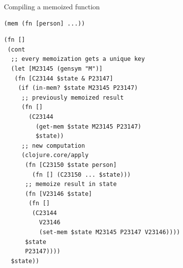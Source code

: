 \documentclass{beamer}
\begin{document}
\begin{frame}[fragile]{Compiling a memoized function}
    \vspace{-2em}
    \begin{minipage}{0.38\textwidth}
\begin{verbatim}
(mem (fn [person] ...))
\end{verbatim}
    \end{minipage}
    \begin{minipage}{0.52\textwidth}
    \vspace{2em}
\begin{verbatim}
(fn []
 (cont
  ;; every memoization gets a unique key  
  (let [M23145 (gensym "M")]
   (fn [C23144 $state & P23147]
    (if (in-mem? $state M23145 P23147)
     ;; previously memoized result
     (fn []
       (C23144
         (get-mem $state M23145 P23147)
         $state))
     ;; new computation
     (clojure.core/apply
      (fn [C23150 $state person]
        (fn [] (C23150 ... $state)))
      ;; memoize result in state
      (fn [V23146 $state]
       (fn []
        (C23144
          V23146
          (set-mem $state M23145 P23147 V23146))))
      $state
      P23147))))
  $state))
\end{verbatim}
    \end{minipage}
\end{frame}
\end{document}

